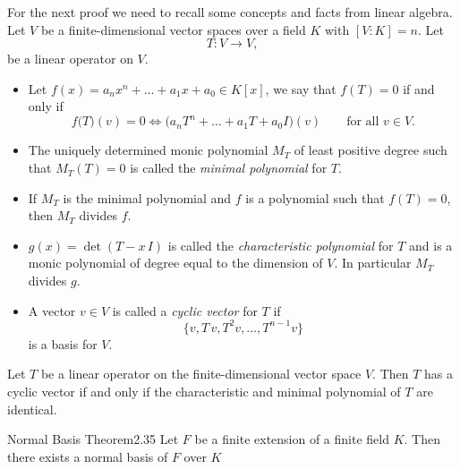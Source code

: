 \begin{oss}
	For the next proof we need to recall some concepts and facts from linear algebra.
	Let \(V\) be a finite-dimensional vector spaces over a field \(K\) with \([V:K]=n\). Let
	\[
		T\colon V \longrightarrow V,
	\]
	be a linear operator on \(V\).
	\begin{itemize}
		\item Let \(f(x)=a_n x^n + \ldots + a_1 x + a_0 \in K[x]\), we say that \(f(T)=0\) if and only if
		      \[
			      f\big(T\big)(v) = 0 \iff \big(a_n T^n + \ldots + a_1 T + a_0 I\big)(v) \qquad\text{for all }v \in V.
		      \]
		\item The uniquely determined monic polynomial \(M_T\) of least positive degree such that \(M_T(T)=0\) is called the \emph{minimal polynomial} for \(T\).
		\item If \(M_T\) is the minimal polynomial and \(f\) is a polynomial such that \(f(T)=0\), then \(M_T\) divides \(f\).
		\item \(g(x) = \det(T-x\,I)\) is called the \emph{characteristic polynomial} for \(T\) and is a monic polynomial of degree equal to the dimension of \(V\). In particular \(M_T\) divides \(g\).
		\item A vector \(v\in V\) is called a \emph{cyclic vector} for \(T\) if
		      \[
			      \{v, T\,v, T^2 v, \ldots, T^{n-1}v\}
		      \]
		      is a basis for \(V\).
	\end{itemize}
\end{oss}

\begin{lem}
	Let \(T\) be a linear operator on the finite-dimensional vector space \(V\). Then \(T\) has a cyclic vector if and only if the characteristic and minimal polynomial of \(T\) are identical.
\end{lem}

\begin{teor}{Normal Basis Theorem}{2.35}
	Let \(F\) be a finite extension of a finite field \(K\).
	Then there exists a normal basis of \(F\) over \(K\)
\end{teor}

